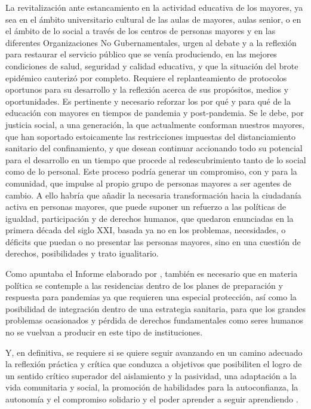 \documentclass{textolivre}
\begin{document}
La revitalización ante estancamiento en la actividad educativa de los mayores, ya sea en el ámbito universitario cultural de las aulas de mayores, aulas senior, o en el ámbito de lo social a través de los centros de personas mayores y en las diferentes Organizaciones No Gubernamentales, urgen al debate y a la reflexión para restaurar el servicio público que se venía produciendo, en las mejores condiciones de salud, seguridad y calidad educativa, y que la situación del brote epidémico cauterizó por completo. Requiere el replanteamiento de protocolos oportunos para su desarrollo y la reflexión acerca de sus propósitos, medios y oportunidades. Es pertinente y necesario reforzar los por qué y para qué de la educación con mayores en tiempos de pandemia y post-pandemia. Se le debe, por justicia social, a una generación, la que actualmente conforman nuestros mayores, que han soportado estoicamente las restricciones impuestas del distanciamiento sanitario del confinamiento, y que desean continuar accionando todo su potencial para el desarrollo en un tiempo que procede al redescubrimiento tanto de lo social como de lo personal. Este proceso podría generar un compromiso, con y para la comunidad, que impulse al propio grupo de personas mayores a ser agentes de cambio. A ello habría que añadir la necesaria transformación hacia la ciudadanía activa en personas mayores, que puede suponer un refuerzo a las políticas de igualdad, participación y de derechos humanos, que quedaron enunciadas en la primera década del siglo XXI, basada ya no en los problemas, necesidades, o déficits que puedan o no presentar las personas mayores, sino en una cuestión de derechos, posibilidades y trato igualitario.

Como apuntaba el Informe elaborado por \textcite{del_pino2020}, %
también es necesario que en materia política se contemple a las residencias dentro de los planes de preparación y respuesta para pandemias ya que requieren una especial protección, así como la posibilidad de integración dentro de una estrategia sanitaria, para que los grandes problemas ocasionados y pérdida de derechos fundamentales como seres humanos no se vuelvan a producir en este tipo de instituciones.

Y, en definitiva, se requiere si se quiere seguir avanzando en un camino adecuado la reflexión práctica y crítica que conduzca a objetivos que posibiliten el logro de un sentido crítico superador del aislamiento y la pasividad, una adaptación a la vida comunitaria y social, la promoción  de habilidades para la autoconfianza, la autonomía y el compromiso solidario y el poder aprender a seguir aprendiendo \cite{martinezdemiguel2017}. %
\end{document}
